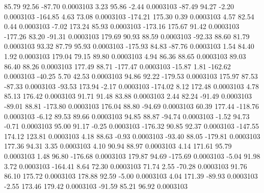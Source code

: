        85.79       92.56      -87.70     0.0003103
        3.23       95.86       -2.44     0.0003103
      -87.49       94.27       -2.20     0.0003103
     -164.85        4.63       73.08     0.0003103
     -174.21      175.30        0.39     0.0003103
        4.57       82.54        0.44     0.0003103
       -7.02      173.24       85.93     0.0003103
     -173.16      175.67       91.42     0.0003103
     -177.26       83.20      -91.31     0.0003103
      179.69       90.93       88.59     0.0003103
      -92.33       88.60       81.79     0.0003103
       93.32       87.79       95.93     0.0003103
     -175.93       84.83      -87.76     0.0003103
        1.54       84.40        1.92     0.0003103
      179.04       79.15       89.80     0.0003103
        4.94       86.36       88.65     0.0003103
       89.03       86.40       88.26     0.0003103
      177.49       88.71     -177.47     0.0003103
      -15.87        1.81     -162.62     0.0003103
      -40.25        5.70       42.53     0.0003103
       94.86       92.22     -179.53     0.0003103
      175.97       87.53      -87.33     0.0003103
      -93.53      173.94       -2.17     0.0003103
     -174.02        8.12      172.48     0.0003103
        4.78       85.13      176.42     0.0003103
       91.71       91.48       83.88     0.0003103
        2.44       82.24      -91.49     0.0003103
      -89.01       88.81     -173.80     0.0003103
      176.04       88.80      -94.69     0.0003103
       60.39      177.44     -118.76     0.0003103
       -6.12       89.53       89.66     0.0003103
       94.85       88.87      -94.74     0.0003103
       -1.52       94.73       -0.71     0.0003103
       95.00       91.17       -0.25     0.0003103
     -176.32       90.85       92.37     0.0003103
     -147.55      174.12      123.81     0.0003103
        4.18       88.63       -0.93     0.0003103
      -93.40       88.05     -179.81     0.0003103
      177.36       94.31        3.35     0.0003103
        4.10       90.94       88.97     0.0003103
        4.14      171.61       95.79     0.0003103
        1.48       96.80     -176.68     0.0003103
      179.87       94.69     -175.69     0.0003103
       -5.04       91.98        3.72     0.0003103
     -164.41        8.64       72.30     0.0003103
       71.74        2.55      -70.28     0.0003103
       91.76       86.10      175.72     0.0003103
      178.88       92.59       -5.00     0.0003103
        4.04      171.39      -89.93     0.0003103
       -2.55      173.46      179.42     0.0003103
      -91.59       85.21       96.92     0.0003103
